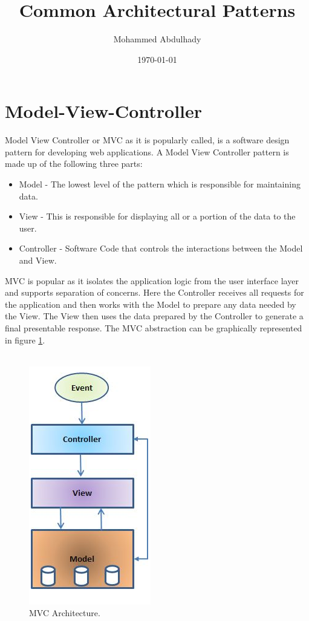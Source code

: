 \documentclass{article}
\begin{document}
\title{Common Architectural Patterns}
\author{Mohammed Abdulhady}
\date{\today}
\maketitle

\tableofcontents
\newpage

\section{Model-View-Controller}

Model View Controller or MVC as it is popularly called, is a software design pattern for developing web applications. A Model View Controller pattern is made up of the following three parts:

\begin{itemize}

\item Model - The lowest level of the pattern which is responsible for maintaining data.
\item View - This is responsible for displaying all or a portion of the data to the user.
\item Controller - Software Code that controls the interactions between the Model and View.

\end{itemize}

\noindent MVC is popular as it isolates the application logic from the user interface layer and supports separation of concerns. Here the Controller receives all requests for the application and then works with the Model to prepare any data needed by the View. The View then uses the data prepared by the Controller to generate a final presentable response. The MVC abstraction can be graphically represented in figure \ref{fig_mvc}.\\\\

\begin{figure}[h]
\centering
\includegraphics[scale=0.8]{mvc.png}
\caption{MVC Architecture.}
\label{fig_mvc}
\end{figure}
\end{document}
